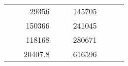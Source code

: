 \begin{table}[H]
\begin{tabular}{|ccrccrccc}
\multicolumn{1}{|c|}{\cellcolor[HTML]{FFFFC7}}                                & \multicolumn{1}{c|}{\cellcolor[HTML]{DDFDFF}}                      & \multicolumn{1}{r|}{\cellcolor[HTML]{DAE8FC}29356}     & \multicolumn{1}{c|}{\cellcolor[HTML]{FFFFC7}}                                & \multicolumn{1}{c|}{\cellcolor[HTML]{DDFDFF}}                       & \multicolumn{1}{r|}{\cellcolor[HTML]{DDFDFF}145705}    &                                                                              &                                                                    &                                                        \\ \cline{3-3} \cline{6-6}
\multicolumn{1}{|c|}{\cellcolor[HTML]{FFFFC7}}                                & \multicolumn{1}{c|}{\cellcolor[HTML]{DDFDFF}}                      & \multicolumn{1}{r|}{\cellcolor[HTML]{DDFDFF}150366}    & \multicolumn{1}{c|}{\cellcolor[HTML]{FFFFC7}}                                & \multicolumn{1}{c|}{\cellcolor[HTML]{DDFDFF}}                       & \multicolumn{1}{r|}{\cellcolor[HTML]{DAE8FC}241045}    &                                                                              &                                                                    &                                                        \\ \cline{3-3} \cline{6-6}
\multicolumn{1}{|c|}{\cellcolor[HTML]{FFFFC7}}                                & \multicolumn{1}{c|}{\cellcolor[HTML]{DDFDFF}}                      & \multicolumn{1}{r|}{\cellcolor[HTML]{DAE8FC}118168}    & \multicolumn{1}{c|}{\cellcolor[HTML]{FFFFC7}}                                & \multicolumn{1}{c|}{\cellcolor[HTML]{DDFDFF}}                       & \multicolumn{1}{r|}{\cellcolor[HTML]{DDFDFF}280671}    &                                                                              &                                                                    &                                                        \\ \cline{3-3} \cline{6-6}
\multicolumn{1}{|c|}{\cellcolor[HTML]{FFFFC7}}                                & \multicolumn{1}{c|}{\cellcolor[HTML]{DDFDFF}}                      & \multicolumn{1}{r|}{\cellcolor[HTML]{DDFDFF}20407.8}   & \multicolumn{1}{c|}{\cellcolor[HTML]{FFFFC7}}                                & \multicolumn{1}{c|}{\cellcolor[HTML]{DDFDFF}}                       & \multicolumn{1}{r|}{\cellcolor[HTML]{DAE8FC}616596}    &                                                                              &                                                                    &                                                        \\ \cline{3-3} \cline{6-6}

\end{tabular}
\end{table}
